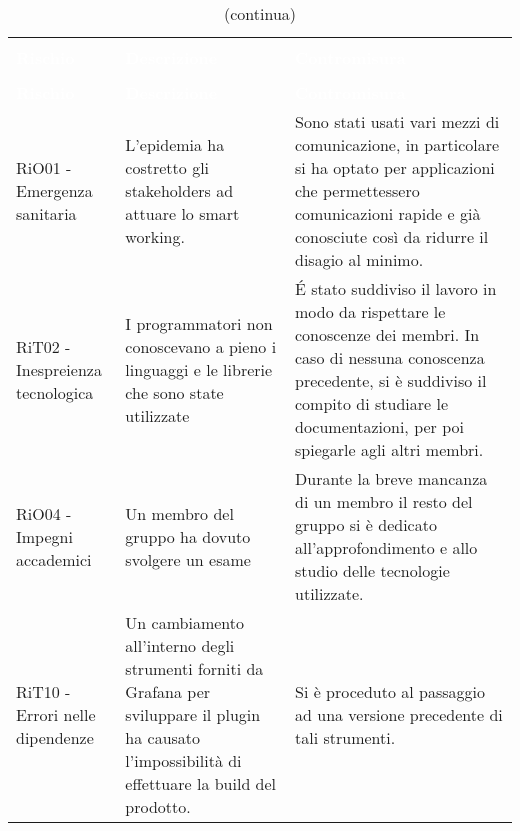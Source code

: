 \begin{longtable}{C{3cm} L{5cm} L{7cm}}
\caption{Attuazione dei rischi} \\
\textcolor{white}{\textbf{Rischio}} &
\textcolor{white}{\textbf{Descrizione}} &
\textcolor{white}{\textbf{Contromisura}}\\
		\endfirsthead
		\caption[]{(continua)} \\
\textcolor{white}{\textbf{Rischio}} &
\textcolor{white}{\textbf{Descrizione}} &
\textcolor{white}{\textbf{Contromisura}}\\
		\endhead
RiO01 - Emergenza sanitaria	& L'epidemia ha costretto gli stakeholders ad attuare lo smart working. & Sono stati usati vari mezzi di comunicazione, in particolare si ha optato per applicazioni che permettessero comunicazioni rapide e già conosciute così da ridurre il disagio al minimo.
\\
RiT02 - Inespreienza tecnologica & I programmatori non conoscevano a pieno i linguaggi e le librerie che sono state utilizzate & \'E stato suddiviso il lavoro in modo da rispettare le conoscenze dei membri. In caso di nessuna conoscenza precedente, si è suddiviso il compito di studiare le documentazioni, per poi spiegarle agli altri membri.
\\
RiO04 - Impegni accademici & Un membro del gruppo ha dovuto svolgere un esame & Durante la breve mancanza di un membro il resto del gruppo si è dedicato all'approfondimento e allo studio delle tecnologie utilizzate.
\\
RiT10 - Errori nelle dipendenze & Un cambiamento all'interno degli strumenti forniti da Grafana per sviluppare il plugin ha causato l'impossibilità di effettuare la build del prodotto. & Si è proceduto al passaggio ad una versione precedente di tali strumenti.
\end{longtable}